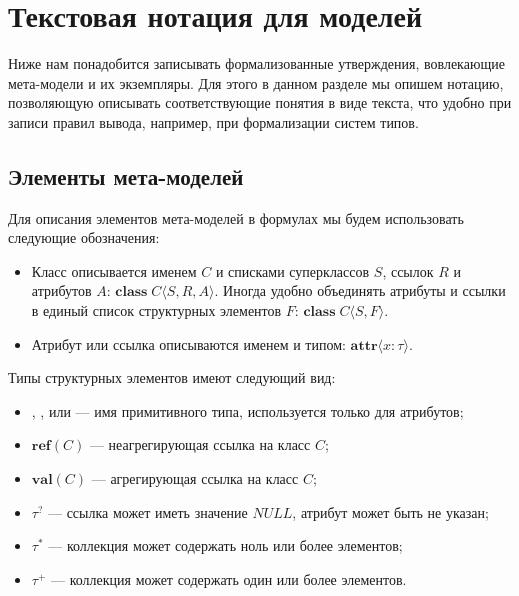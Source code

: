 \chapter{Текстовая нотация для моделей}
Ниже нам понадобится записывать формализованные утверждения, вовлекающие мета-модели и их экземпляры. Для этого в данном разделе мы опишем нотацию, позволяющую описывать соответствующие понятия в виде текста, что удобно при записи правил вывода, например, при формализации систем типов.

\section{Элементы мета-моделей}

Для описания элементов мета-моделей в формулах мы будем использовать следующие обозначения:
%
\newcommand{\class}[4]{\mathbf{class}\; #1 \langle #2, #3, #4\rangle}%
\newcommand{\classf}[3]{\mathbf{class}\; #1 \langle #2, #3\rangle}%
\newcommand{\reference}[3]{\mathbf{#1}\langle #2 : #3\rangle}%
\newcommand{\attribute}[2]{\mathbf{attr}\langle #1 : #2\rangle}%
%
\begin{itemize}
\item Класс описывается именем $C$ и списками суперклассов $S$, ссылок $R$ и атрибутов $A$: $\class{C}{S}{R}{A}$. Иногда удобно объединять атрибуты и ссылки в единый список структурных элементов $F$: $\classf{C}{S}{F}$.
\item Атрибут или ссылка описываются именем и типом: $\attribute{x}{\tau}$.
\end{itemize}
%
\newcommand{\type}[2]{#1\left(#2\right)}%
\newcommand{\valts}{\mathbf{val}}%
\newcommand{\valt}[1]{\type{\valts}{#1}}%
\newcommand{\refts}{\mathbf{ref}}%
\newcommand{\reft}[1]{\type{\refts}{#1}}%
%
Типы структурных элементов имеют следующий вид:
\begin{itemize}
\item {}, ,  или  --- имя примитивного типа, используется только для атрибутов;
\item $\reft{C}$ --- неагрегирующая ссылка на класс $C$;
\item $\valt{C}$ --- агрегирующая ссылка на класс $C$;
\item $\tau^?$ --- ссылка может иметь значение $NULL$, атрибут может быть не указан;
\item $\tau^*$ --- коллекция может содержать ноль или более элементов;
\item $\tau^+$ --- коллекция может содержать один или более элементов.
\end{itemize}
%
